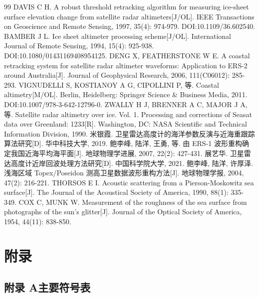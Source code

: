 \documentclass[a4paper]{article}
\newcommand{\song}{\CJKfamily{song}}
\newcommand{\xiaosihao}{\fontsize{12pt}{18pt}\selectfont}
\newcommand\seccontent{
	\song
	\xiaosihao
    \setlength{\parindent}{2em}
    \setlength{\parskip}{0pt}
    }
\begin{document}
\begin{thebibliography}{99}
	 DAVIS C H. A robust threshold retracking algorithm for measuring ice-sheet surface elevation change from satellite radar altimeters[J/OL]. IEEE Transactions on Geoscience and Remote Sensing, 1997, 35(4): 974-979. DOI:10.1109/36.602540.
	 BAMBER J L. Ice sheet altimeter processing scheme[J/OL]. International Journal of Remote Sensing, 1994, 15(4): 925-938. DOI:10.1080/01431169408954125.
	 DENG X, FEATHERSTONE W E. A coastal retracking system for satellite radar altimeter waveforms: Application to ERS-2 around Australia[J]. Journal of Geophysical Research, 2006, 111(C06012): 285-293.
	 VIGNUDELLI S, KOSTIANOY A G, CIPOLLINI P, 等. Coastal altimetry[M/OL]. Berlin, Heidelberg: Springer Science \& Business Media, 2011. DOI:10.1007/978-3-642-12796-0.
	 ZWALLY H J, BRENNER A C, MAJOR J A, 等. Satellite radar altimetry over ice. Vol. 1. Processing and corrections of Seasat data over Greenland: 1233[R]. Washington, DC: NASA Scientific and Technical Information Division, 1990.
	 米银霞. 卫星雷达高度计的海洋参数反演与近海重跟踪算法研究[D]. 华中科技大学, 2019.
	 鲍李峰, 陆洋, 王勇, 等. 由 ERS-1 波形重构确定我国近海平均海平面[J]. 地球物理学进展, 2007, 22(2): 427-431.
	 展艺华. 卫星雷达高度计近岸回波处理方法研究[D]. 中国科学院大学, 2021.
	 鲍李峰, 陆洋, 许厚泽. 浅海区域 Topex/Poseidon 测高卫星数据波形重构方法[J]. 地球物理学报, 2004, 47(2): 216-221.
	 THORSOS E I. Acoustic scattering from a Pierson-Moskowitz sea surface[J]. The Journal of the Acoustical Society of America, 1990, 88(1): 335-349.
	 COX C, MUNK W. Measurement of the roughness of the sea surface from photographs of the sun's glitter[J]. Journal of the Optical Society of America, 1954, 44(11): 838-850.
\end{thebibliography}

\appendix
{}
{}
\section*{附录}

\subsection*{附录 A\quad 主要符号表}
\seccontent
\end{document}
